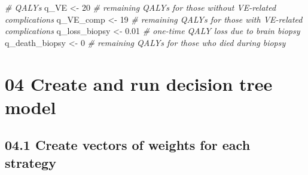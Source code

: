 \documentclass[
]{article}
\newenvironment{Shaded}{\begin{snugshade}}{\end{snugshade}}
\newcommand{\CommentTok}[1]{\textcolor[rgb]{0.56,0.35,0.01}{\textit{#1}}}
\newcommand{\DecValTok}[1]{\textcolor[rgb]{0.00,0.00,0.81}{#1}}
\newcommand{\FloatTok}[1]{\textcolor[rgb]{0.00,0.00,0.81}{#1}}
\newcommand{\NormalTok}[1]{#1}
\newcommand{\OtherTok}[1]{\textcolor[rgb]{0.56,0.35,0.01}{#1}}
\begin{document}
\begin{Shaded}
\begin{Highlighting}[]
\CommentTok{\# QALYs}
\NormalTok{q\_VE           }\OtherTok{\textless{}{-}} \DecValTok{20}     \CommentTok{\# remaining QALYs for those without VE{-}related complications}
\NormalTok{q\_VE\_comp      }\OtherTok{\textless{}{-}} \DecValTok{19}     \CommentTok{\# remaining QALYs for those with    VE{-}related complications}
\NormalTok{q\_loss\_biopsy  }\OtherTok{\textless{}{-}} \FloatTok{0.01}   \CommentTok{\# one{-}time  QALY loss due to brain biopsy}
\NormalTok{q\_death\_biopsy }\OtherTok{\textless{}{-}} \DecValTok{0}      \CommentTok{\# remaining QALYs for those who died during biopsy}
\end{Highlighting}
\end{Shaded}

\hypertarget{create-and-run-decision-tree-model}{%
\section{04 Create and run decision tree
model}\label{create-and-run-decision-tree-model}}

\hypertarget{create-vectors-of-weights-for-each-strategy}{%
\subsection{04.1 Create vectors of weights for each
strategy}\label{create-vectors-of-weights-for-each-strategy}}
\end{document}
